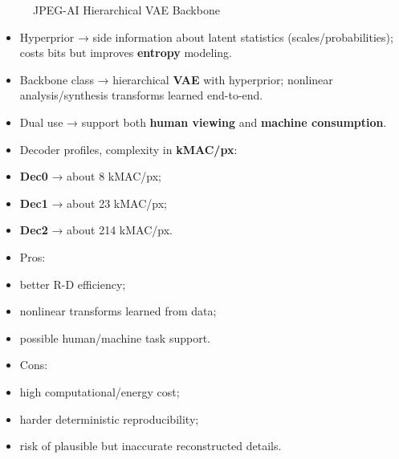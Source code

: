 \begin{figure}[H]
\centering
{}
\caption{JPEG-AI Hierarchical VAE Backbone}
\end{figure}


\begin{itemize}
  \item Hyperprior → side information about latent statistics (scales/probabilities); costs bits but improves \textbf{entropy} modeling.
  \item Backbone class → hierarchical \textbf{VAE} with hyperprior; nonlinear analysis/synthesis transforms learned end-to-end.
  \item Dual use → support both \textbf{human viewing} and \textbf{machine consumption}.
  \item Decoder profiles, complexity in \textbf{kMAC/px}:
  \item \textbf{Dec0} → about 8 kMAC/px;
  \item \textbf{Dec1} → about 23 kMAC/px;
  \item \textbf{Dec2} → about 214 kMAC/px.
  \item Pros:
  \item better R-D efficiency;
  \item nonlinear transforms learned from data;
  \item possible human/machine task support.
  \item Cons:
  \item high computational/energy cost;
  \item harder deterministic reproducibility;
  \item risk of plausible but inaccurate reconstructed details.
\end{itemize}



